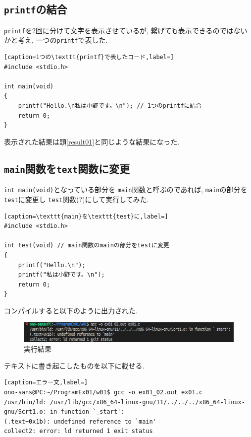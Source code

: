 \documentclass[a4paper, xelatex, ja=standard, 10.5pt]{bxjsarticle}
\begin{document}
\subsection{\texttt{printf}の結合}

\texttt{printf}を2回に分けて文字を表示させているが,
繋げても表示できるのではないかと考え,
一つの\texttt{printf}で表した.

\begin{lstlisting}[caption=1つの\texttt{printf}で表したコード,label=]
#include <stdio.h>

int main(void)
{
    printf("Hello.\n私は小野です。\n"); // 1つのprintfに結合
    return 0;
}
\end{lstlisting}

表示された結果は頭\ref{result01}と同じような結果になった.

\subsection{\texttt{main}関数を\texttt{text}関数に変更}

\texttt{int main(void)}となっている部分を
\texttt{main}関数と呼ぶのであれば,
\texttt{main}の部分を\texttt{test}に変更し
\texttt{test}関数(?)にして実行してみた.

\begin{lstlisting}[caption=\texttt{main}を\texttt{test}に,label=]
#include <stdio.h>

int test(void) // main関数のmainの部分をtestに変更
{
    printf("Hello.\n");
    printf("私は小野です。\n");
    return 0;
}
\end{lstlisting}

コンパイルすると以下のように出力された.

\begin{figure}[H]
  \centering
  \includegraphics[scale=0.7]{img/error_main.png}
  \caption{実行結果}
  \label{result02}
\end{figure}

テキストに書き起こしたものを以下に載せる.

\begin{lstlisting}[caption=エラー文,label=]
ono-sans@PC:~/ProgramEx01/w01$ gcc -o ex01_02.out ex01.c
/usr/bin/ld: /usr/lib/gcc/x86_64-linux-gnu/11/../../../x86_64-linux-gnu/Scrt1.o: in function `_start':
(.text+0x1b): undefined reference to `main'
collect2: error: ld returned 1 exit status
\end{lstlisting}
\end{document}

